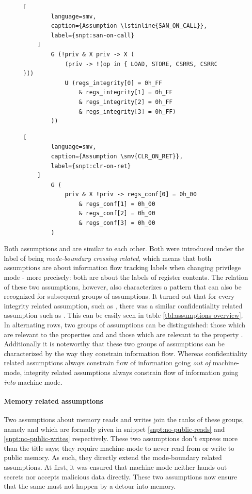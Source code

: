 \begin{figure}
    \begin{lstlisting}[
        language=smv,
        caption={Assumption \lstinline{SAN_ON_CALL}},
        label={snpt:san-on-call}
    ]
        G (!priv & X priv -> X (
            (priv -> !(op in { LOAD, STORE, CSRRS, CSRRC }))
            U (regs_integrity[0] = 0h_FF
                & regs_integrity[1] = 0h_FF
                & regs_integrity[2] = 0h_FF
                & regs_integrity[3] = 0h_FF)
        ))
    \end{lstlisting}

    \begin{lstlisting}[
        language=smv,
        caption={Assumption \smv{CLR_ON_RET}},
        label={snpt:clr-on-ret}
    ]
        G (
            priv & X !priv -> regs_conf[0] = 0h_00
                & regs_conf[1] = 0h_00
                & regs_conf[2] = 0h_00
                & regs_conf[3] = 0h_00
        )
    \end{lstlisting}
\end{figure}

Both assumptions  and  are similar to each other.
Both were introduced under the label of being \textit{mode-boundary crossing related}, which means that both assumptions are about information flow tracking labels when changing privilege mode - more precisely: both are about the labels of register contents.
The relation of these two assumptions, however, also characterizes a pattern that can also be recognized for subsequent groups of assumptions.
It turned out that for every integrity related assumption, such as , there was a similar confidentiality related assumption such as .
This can be easily seen in table \ref{tbl:assumptions-overview}.
In alternating rows, two groups of assumptions can be distinguished: those which are relevant to the properties  and  and those which are relevant to the property .
Additionally it is noteworthy that these two groups of assumptions can be characterized by the way they constrain information flow.
Whereas confidentiality related assumptions always constrain flow of information going \textit{out of} machine-mode, integrity related assumptions always constrain flow of information going \textit{into} machine-mode.

\paragraph{Memory related assumptions}
Two assumptions about memory reads and writes join the ranks of these groups, namely  and  which are formally given in snippet \ref{snpt:no-public-reads} and \ref{snpt:no-public-writes} respectively.
These two assumptions don't express more than the title says; they require machine-mode to never read from or write to public memory.
As such, they directly extend the mode-boundary related assumptions.
At first, it was ensured that machine-mode neither hands out secrets nor accepts malicious data directly.
These two assumptions now ensure that the same must not happen by a detour into memory.

